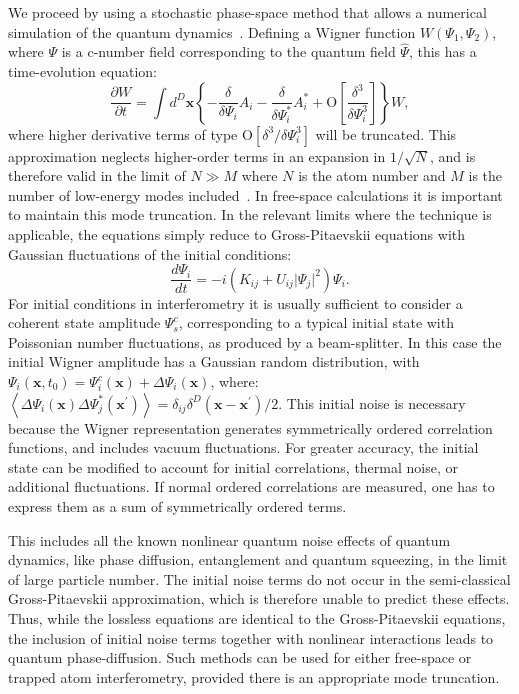 \documentclass[aps,prl,twocolumn,showpacs,amsmath,amssymb,superscriptaddress,flushbottom,noraggedfooter]{revtex4-1}
\newcommand{\xvec}{\boldsymbol{x}}
\newcommand{\Psivec}{\boldsymbol{\Psi}}
\begin{document}
We proceed by using a stochastic phase-space method that allows a numerical
simulation of the quantum dynamics~\cite{Drummond1993,Steel1998,Hoffmann2008}.
Defining a Wigner function $W(\Psi_1, \Psi_2)$, where $\Psi$
is a c-number field corresponding to the quantum field $\hat{\Psi}$, this has a time-evolution equation:
\begin{equation}
	\frac{\partial W}{\partial t} = \int d^D\xvec \left\{
		- \frac{\delta}{\delta\Psi_i} A_i
		- \frac{\delta}{\delta\Psi_i^*}A_i^*
		+ \mbox{O} \left[ \frac{\delta^3}{\delta\Psi_i^3} \right]
	\right\} W,
\end{equation}
where higher derivative terms of type $\mbox{O} \left[ \delta^3 / \delta\Psi_i^3 \right]$ will be truncated.
This approximation neglects higher-order terms in an expansion in $1 / \sqrt{N}$,
and is therefore valid in the limit of $N \gg M$
where $N$ is the atom number and $M$ is the number of low-energy modes included~\cite{Drummond1993,Sinatra2002,Norrie2006}.
In free-space calculations it is important to maintain this mode truncation.
In the relevant limits where the technique is applicable, the equations
simply reduce to Gross-Pitaevskii equations with Gaussian fluctuations
of the initial conditions:
\begin{equation}
\label{eqn:SDE-1}
	\frac{d\Psi_i}{dt} = -i \left(
		K_{ij} + U_{ij} \lvert \Psi_j \rvert^2
	\right) \Psi_i.
\end{equation}
For initial conditions in interferometry it is usually sufficient to consider
a coherent state amplitude $\Psi_s^c$,
corresponding to a typical initial state with Poissonian number fluctuations,
as produced by a beam-splitter.
In this case the initial Wigner amplitude has a Gaussian random distribution, with
$\Psi_i(\xvec, t_0) = \Psi_i^c(\xvec) + \Delta \Psi_i(\xvec)$, where:
$\left\langle \Delta \Psi_i(\xvec) \Delta \Psi_j^*(\xvec^{\prime}) \right\rangle =
\delta_{ij} \delta^D(\xvec - \xvec^{\prime}) / 2.$
This initial noise is necessary because the Wigner representation generates
symmetrically ordered correlation functions, and includes vacuum fluctuations.
For greater accuracy, the initial state can be modified to account for
initial  correlations, thermal noise, or additional fluctuations.
If normal ordered correlations are measured, one has to express them
as a sum of symmetrically ordered terms.

This includes all the known nonlinear quantum noise effects of quantum dynamics,
like phase diffusion, entanglement and quantum squeezing, in the limit
of large particle number.
The initial noise terms do not occur in the semi-classical Gross-Pitaevskii
approximation, which is therefore unable to predict these effects.
Thus, while the lossless equations are identical to the Gross-Pitaevskii
equations, the inclusion of initial noise terms together with nonlinear
interactions leads to quantum phase-diffusion.
Such methods can be used for either free-space or trapped atom interferometry,
provided there is an appropriate mode truncation.
\end{document}
